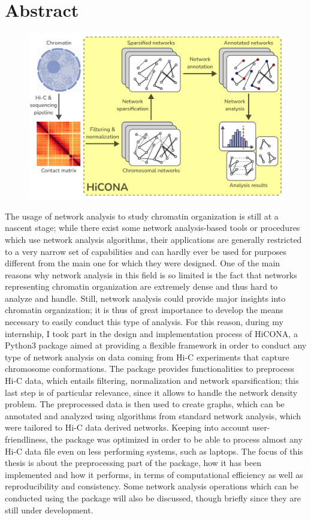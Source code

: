 \graphicspath{{chapters/01_abstract/images}}
\chapter*{Abstract}
\vspace{-1.5cm}

\begin{figure}[h]
  \centering
  \includegraphics[width=1\textwidth]{graphical_abstract.png}
\end{figure}

The usage of network analysis to study chromatin organization is still at a nascent stage; while there exist some network analysis-based tools or procedures which use network analysis algorithms, their applications are generally restricted to a very narrow set of capabilities and can hardly ever be used for purposes different from the main one for which they were designed. One of the main reasons why network analysis in this field is so limited is the fact that networks representing chromatin organization are extremely dense and thus hard to analyze and handle. Still, network analysis could provide major insights into chromatin organization; it is thus of great importance to develop the means necessary to easily conduct this type of analysis. For this reason, during my internship, I took part in the design and implementation process of HiCONA, a Python3 package aimed at providing a flexible framework in order to conduct any type of network analysis on data coming from Hi-C experiments that capture chromosome conformations. The package provides functionalities to preprocess Hi-C data, which entails filtering, normalization and network sparsification; this last step is of particular relevance, since it allows to handle the network density problem. The preprocessed data is then used to create graphs, which can be annotated and analyzed using algorithms from standard network analysis, which were tailored to Hi-C data derived networks. Keeping into account user-friendliness, the package was optimized in order to be able to process almost any Hi-C data file even on less performing systems, such as laptops. The focus of this thesis is about the preprocessing part of the package, how it has been implemented and how it performs, in terms of computational efficiency as well as reproducibility and consistency. Some network analysis operations which can be conducted using the package will also be discussed, though briefly since they are still under development.
